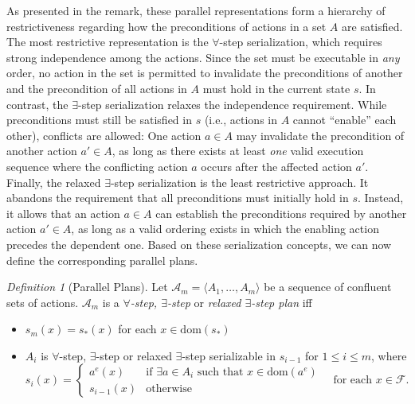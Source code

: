 \documentclass[
     11pt,                    %
     a4paper,             %
     BCOR=10mm,     %
     DIV=14,                 %
     listof=totoc,                    %
     bibliography=totoc,       %
     index=totoc,              %
     parskip            %
     twoside,
     headsepline
     ]{scrreprt}
\theoremstyle{definition}
\theoremstyle{definition}
\theoremstyle{remark}
\theoremstyle{bfnote}
\newtheorem{defi}{Definition}
\newcommand{\dom}{\mathrm{dom}}
\begin{document}
As presented in the remark, these parallel representations form a hierarchy of restrictiveness regarding how the preconditions of actions in a set $A$ are satisfied.
The most restrictive representation is the $\forall$-step serialization, which requires strong independence among the actions. Since the set must be executable in \textit{any} order, no action in the set is permitted to invalidate the preconditions of another and the precondition of all actions in $A$ must hold in the current state $s$.
In contrast, the $\exists$-step serialization relaxes the independence requirement. While preconditions must still be satisfied in $s$ (i.e., actions in $A$ cannot \enquote{enable} each other), conflicts are allowed: One action $a \in A$ may invalidate the precondition of another action $a' \in A$, as long as there exists at least \textit{one} valid execution sequence where the conflicting action $a$ occurs after the affected action $a'$.
Finally, the relaxed $\exists$-step serialization is the least restrictive approach. It abandons the requirement that all preconditions must initially hold in $s$. Instead, it allows that an action $a \in A$ can establish the preconditions required by another action $a' \in A$, as long as a valid ordering exists in which the enabling action precedes the dependent one.
Based on these serialization concepts, we can now define the corresponding parallel plans.

\begin{defi}[Parallel Plans]
  \label{def:PPlan}
  Let $\mathcal A_m = \langle A_1, \dots, A_m \rangle$ be a sequence of confluent sets of actions. $\mathcal A_m$ is a \textit{$\forall$-step, $\exists$-step} or \textit{relaxed $\exists$-step plan} iff
  \begin{itemize}
    \item $s_m(x) = s_*(x)$ for each $x \in \dom(s_*)$
    \item $A_i$ is $\forall$-step, $\exists$-step or relaxed $\exists$-step serializable in $s_{i-1}$ for $1 \le i \le m$, where \\
    \[
      s_i(x) = \begin{cases} 
         a^e(x) & \text{if } \exists a \in A_i \text{ such that } x \in \dom(a^e) \\ 
         s_{i-1}(x) & \text{otherwise} 
      \end{cases} 
      \quad  \text{for each } x \in \mathcal F.
    \]
  \end{itemize}
\end{defi}
\end{document}
